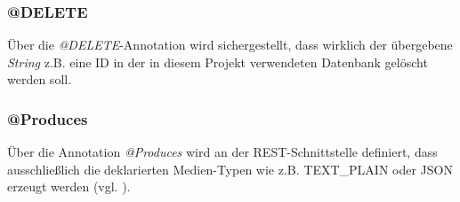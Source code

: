 \subsubsection*{@DELETE}
\label{sss:delete}
Über die \textit{@DELETE}-Annotation wird sichergestellt, dass wirklich der übergebene \textit{String} z.B. eine ID in der in diesem Projekt verwendeten Datenbank gelöscht werden soll.

\subsubsection*{@Produces}
\label{sss:produces}
Über die Annotation  \textit{@Produces} wird an der \acs{REST}-Schnittstelle definiert, dass ausschließlich die deklarierten Medien-Typen wie z.B. TEXT\_PLAIN oder JSON erzeugt werden (vgl. ).